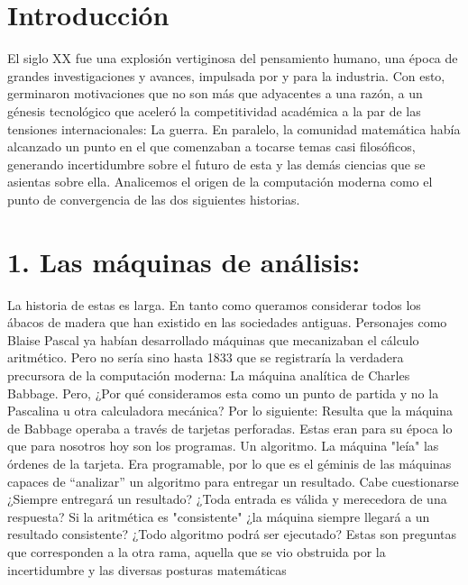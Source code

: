 \documentclass[12pt]{article}
\begin{document}
\begin{multicols}{2}
\section*{Introducción}
El siglo XX fue una explosión vertiginosa del pensamiento humano, una época de grandes investigaciones y avances, impulsada por y para la industria. Con esto, germinaron motivaciones que no son más que  adyacentes a una razón, a un génesis tecnológico que aceleró la competitividad académica a la par de las tensiones internacionales: La guerra. En paralelo, la comunidad matemática había alcanzado un punto en el que comenzaban a tocarse temas casi filosóficos, generando incertidumbre sobre el futuro de esta y las demás ciencias que se asientas sobre ella. Analicemos el origen de la computación moderna como el punto de convergencia de las dos siguientes historias.
\section*{1. Las máquinas de análisis:}
La historia de estas es larga. En tanto como queramos considerar todos los ábacos de madera que han existido en las sociedades antiguas.\cite{Flo} Personajes como Blaise Pascal ya habían desarrollado máquinas que mecanizaban el cálculo aritmético. Pero no sería sino hasta 1833 que se registraría la verdadera precursora de la computación moderna: La máquina analítica de Charles Babbage. Pero, ¿Por qué consideramos esta como un punto de partida y no la Pascalina u otra calculadora mecánica? Por lo siguiente: Resulta que la máquina de Babbage operaba a través de tarjetas perforadas. Estas eran para su época lo que para nosotros hoy son los programas. Un algoritmo. La máquina "leía" las órdenes de la tarjeta. Era programable, por lo que es el géminis de las máquinas capaces de “analizar” un algoritmo para entregar un resultado. Cabe cuestionarse ¿Siempre entregará un resultado? ¿Toda entrada es válida y merecedora de una respuesta? Si la aritmética es "consistente" ¿la máquina siempre llegará a un resultado consistente? ¿Todo algoritmo podrá ser ejecutado? Estas son preguntas que corresponden a la otra rama, aquella que se vio obstruida por la incertidumbre y las diversas posturas matemáticas

\end{multicols}
\end{document}
